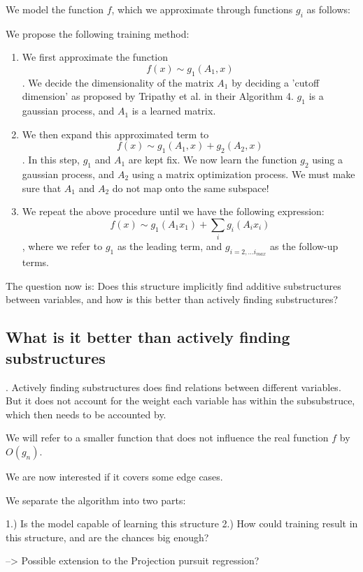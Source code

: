 We model the function $f$, which we approximate through functions $g_{i}$ as follows:

We propose the following training method:

\begin{enumerate}
\item We first approximate the function 
$$ f(x) \sim g_1(A_1, x) $$.
We decide the dimensionality of the matrix $A_1$ by deciding a 'cutoff dimension' as proposed by Tripathy et al. in their Algorithm 4.
$g_1$ is a gaussian process, and $A_1$ is a learned matrix.

\item We then expand this approximated term to
$$ f(x) \sim g_1(A_1, x)  + g_2(A_2, x)$$.
In this step, $g_1$ and $A_1$ are kept fix.
We now learn the function $g_2$ using a gaussian process, and $A_2$ using a matrix optimization process.
We must make sure that $A_1$ and $A_2$ do not map onto the same subspace!

\item We repeat the above procedure until we have the following expression:
$$f(x) \sim g_1(A_1 x_1) + \sum_{i} g_i(A_i x_i)$$, where we refer to $g_1$ as the leading term, and $g_{i=2,...i_{max}}$ as the follow-up terms.

\end{enumerate}

The question now is: Does this structure implicitly find additive substructures between variables, and how is this better than actively finding substructures?

\subsection{What is it better than actively finding substructures}.
Actively finding substructures does find relations between different variables.
But it does not account for the weight each variable has within the subsubstruce, which then needs to be accounted by.

We will refer to a smaller function that does not influence the real function $f$ by $O(g_n)$.

We are now interested if it covers some edge cases.

We separate the algorithm into two parts:

1.) Is the model capable of learning this structure
2.) How could training result in this structure, and are the chances big enough?

--> Possible extension to the Projection pursuit regression?


